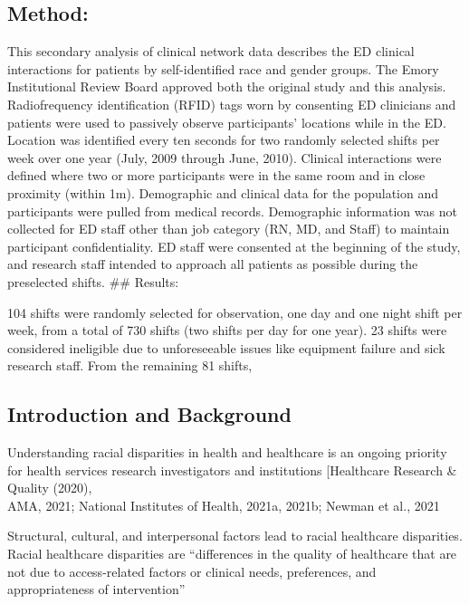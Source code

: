 \documentclass[
]{article}
\begin{document}
\hypertarget{method}{%
\subsection{Method:}\label{method}}

This secondary analysis of clinical network data describes the ED
clinical interactions for patients by self-identified race and gender
groups. The Emory Institutional Review Board approved both the original
study and this analysis. Radiofrequency identification (RFID) tags worn
by consenting ED clinicians and patients were used to passively observe
participants' locations while in the ED. Location was identified every
ten seconds for two randomly selected shifts per week over one year
(July, 2009 through June, 2010). Clinical interactions were defined
where two or more participants were in the same room and in close
proximity (within 1m). Demographic and clinical data for the population
and participants were pulled from medical records. Demographic
information was not collected for ED staff other than job category (RN,
MD, and Staff) to maintain participant confidentiality. ED staff were
consented at the beginning of the study, and research staff intended to
approach all patients as possible during the preselected shifts. \#\#
Results:

104 shifts were randomly selected for observation, one day and one night
shift per week, from a total of 730 shifts (two shifts per day for one
year). 23 shifts were considered ineligible due to unforeseeable issues
like equipment failure and sick research staff. From the remaining 81
shifts,

\hypertarget{introduction-and-background}{%
\subsection{Introduction and
Background}\label{introduction-and-background}}

Understanding racial disparities in health and healthcare is an ongoing
priority for health services research investigators and institutions
{[}Healthcare Research \& Quality (2020),\\
AMA, 2021; National Institutes of Health, 2021a, 2021b; Newman et al.,
2021

Structural, cultural, and interpersonal factors lead to racial
healthcare disparities. Racial healthcare disparities are ``differences
in the quality of healthcare that are not due to access-related factors
or clinical needs, preferences, and appropriateness of intervention''
\end{document}
